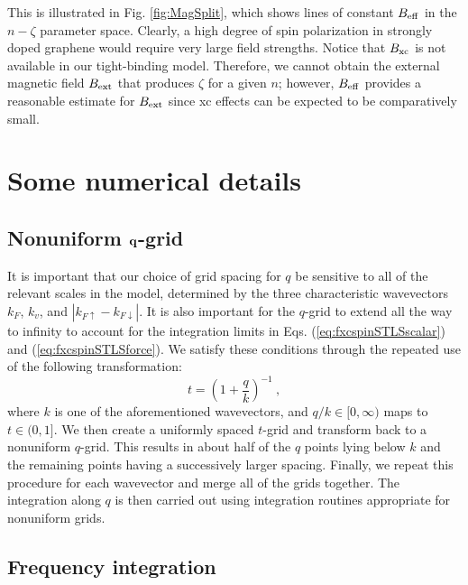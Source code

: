 \documentclass[aps,prb,twocolumn,superscriptaddress]{revtex4-2}
\newcommand{\bfq}{{\bf q}}
\newcommand{\ua}{\uparrow}
\newcommand{\da}{\downarrow}
\newcommand{\ku}{k_{F\ua}}
\newcommand{\kd}{k_{F\da}}
\begin{document}
This is illustrated in Fig. \ref{fig:MagSplit}, which shows lines of constant $B_{\rm eff}$ in the $n-\zeta$
parameter space. Clearly, a high degree of spin polarization in strongly doped graphene would require very large field strengths.
Notice that $B_{\rm xc}$ is not available in our tight-binding model. Therefore, we cannot obtain the external magnetic field $B_{\rm ext}$
that produces $\zeta$ for a given $n$; however, $B_{\rm eff}$ provides a reasonable estimate for $B_{\rm ext}$ since xc effects can be
expected to be comparatively small.


\section{Some numerical details}\label{appC}

\subsection{Nonuniform $\bfq$-grid}

It is important that our choice of grid spacing for $q$ be sensitive to all of the relevant scales in the model,
determined by the three characteristic wavevectors $k_F$, $k_v$, and $|\ku-\kd|$. It is also important for the $q$-grid to extend all
the way to infinity to account for the integration limits in Eqs. (\ref{eq:fxcspinSTLSscalar}) and (\ref{eq:fxcspinSTLSforce}).
We satisfy these conditions through the repeated use of the following transformation:
\begin{equation}
   t = \left(1+\frac{q}{k}\right)^{-1} \:,
\end{equation}
where $k$ is one of the aforementioned wavevectors, and $q/k \in [0,\infty)$ maps to $t \in (0,1]$.
We then create a uniformly spaced $t$-grid and transform back to a nonuniform $q$-grid.
This results in about half of the $q$ points lying below $k$ and the remaining points having a successively larger spacing.
Finally, we repeat this procedure for each wavevector and merge all of the grids together.
The integration along $q$ is then carried out using integration routines appropriate for nonuniform grids.

\subsection{Frequency integration}
\end{document}

